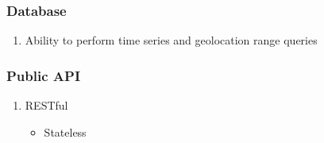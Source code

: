\subsubsection{Database}\label{database}

\begin{enumerate}
\def\labelenumi{\arabic{enumi}.}
\tightlist
\item
  Ability to perform time series and geolocation range queries
\end{enumerate}

\subsubsection{Public API}\label{public-api}

\begin{enumerate}
\def\labelenumi{\arabic{enumi}.}
\tightlist
\item
  RESTful

  \begin{itemize}
  \tightlist
  \item
    Stateless
  \end{itemize}
\end{enumerate}
